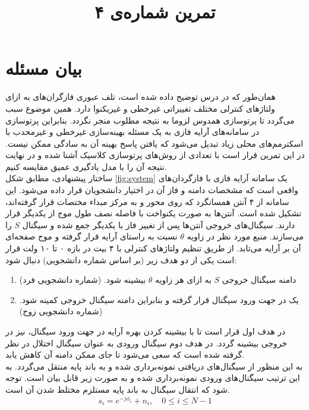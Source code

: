 \documentclass{utsignal}
\title{تمرین شماره‌ی ۴}
\begin{document}
    \maketitle
    \section{بیان مسئله}
    همان‌طور که در درس توضیح داده شده است، تلف عبوری فازگران‌های
   به ازای ولتاژهای کنترلی مختلف تغییراتی غیرخطی و غیریکنوا دارد. همین موضوع سبب می‌گردد تا پرتوسازی همدوس لزوما به نتیجه مطلوب منجر نگردد. بنابراین پرتوسازی در سامانه‌های آرایه فازی به یک مسئله بهینه‌سازی غیرخطی و غیرمحدب با اسکترمم‌های محلی زیاد تبدیل می‌شود که یافتن پاسخ بهینه آن به سادگی ممکن نیست. در این تمرین قرار است با تعدادی از روش‌های پرتوسازی کلاسیک آشنا شده و در نهایت نتیجه آن را با مدل یادگیری عمیق مقایسه کنیم. \\
   ساختار پیشنهادی، مطابق شکل
   \ref{fig:system}
   یک سامانه آرایه فازی با فازگردان‌های
   واقعی است که مشخصات دامنه و فاز آن در اختیار دانشجویان قرار داده می‌شود. این سامانه از ۴ آنتن همسانگرد که روی محور
   و به مرکز مبداء مختصات قرار گرفته‌اند، تشکیل شده است. آنتن‌ها به صورت یکنواخت با فاصله نصف طول موج از یکدیگر قرار دارند. سیگنال‌های خروجی آنتن‌ها پس از تغییر فاز با یکدیگر جمع‌ شده و سیگنال
   $S$
   را می‌سازند. منبع مورد نظر در زاویه
   $\theta$
   نسبت به راستای آرایه قرار گرفته و موج صفحه‌ای آن بر آرایه می‌تابد. از طریق تنظیم ولتاژهای کنترلی با ۴ بیت در بازه ۰ تا ۱۰ ولت قرار است یکی از دو هدف زیر (بر اساس شماره دانشجویی) دنبال شود:
    \begin{enumerate}
    	\item دامنه سیگنال خروجی 
    	$S$
    	به ازای هر زاویه
    	$\theta$
    	بیشینه شود. (شماره دانشجویی‌ فرد)
    	\item یک
    	در جهت ورود سیگنال قرار گرفته و بنابراین دامنه سیگنال خروجی کمینه شود. (شماره دانشجویی ‌زوج)
    \end{enumerate}
   در هدف اول قرار است تا با بیشینه کردن بهره آرایه در جهت ورود سیگنال،
   نیز در خروجی بیشینه گردد. در هدف دوم سیگنال ورودی به عنوان سیگنال اختلال در نظر گرفته شده است که سعی می‌شود تا جای ممکن دامنه آن کاهش یابد. \\
    به این منظور از سیگنال‌های دریافتی نمونه‌برداری شده و به باند پایه منتقل می‌گردد. به این ترتیب سیگنال‌های ورودی نمونه‌برداری شده و به صورت زیر قابل بیان است. توجه شود که انتقال سیگنال به باند پایه مستلزم مختلط شدن آن است.
    \begin{equation}
    	s_i = e^{-j\phi_i} + n_i, \quad 0\leq i \leq N - 1
    \end{equation}
\end{document}
